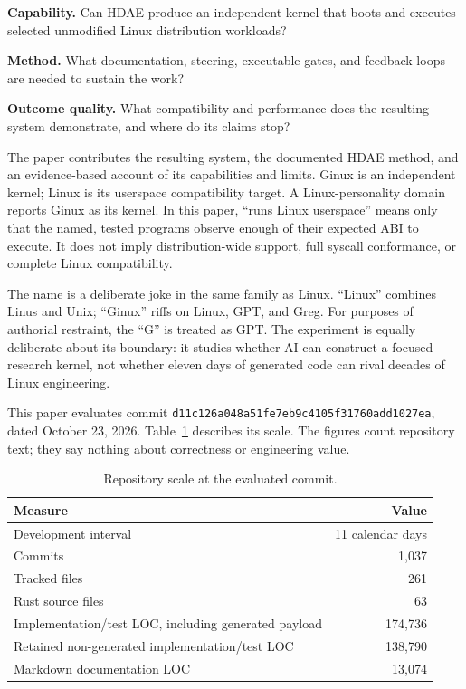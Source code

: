 \documentclass[11pt]{article}
\newcommand{\evaluatedcommit}{\texttt{d11c126a048a\allowbreak{}51fe7eb9c410\allowbreak{}5f31760add10\allowbreak{}27ea}}
\begin{document}
\begin{description}[
  style=multiline,
  leftmargin=0.82in,
  labelwidth=0.62in,
  labelsep=0.20in,
  itemsep=0.45em,
  topsep=0.45em
]
\item[\textbf{RQ1}] \textbf{Capability.} Can HDAE produce an independent kernel
  that boots and executes selected unmodified Linux distribution workloads?
\item[\textbf{RQ2}] \textbf{Method.} What documentation, steering, executable
  gates, and feedback loops are needed to sustain the work?
\item[\textbf{RQ3}] \textbf{Outcome quality.} What compatibility and performance
  does the resulting system demonstrate, and where do its claims stop?
\end{description}

The paper contributes the resulting system, the documented HDAE method,
and an evidence-based account of its capabilities and limits. Ginux is
an independent kernel; Linux is its userspace compatibility target. A
Linux-personality domain reports Ginux as its kernel. In this paper,
``runs Linux userspace'' means only that the named, tested programs observe
enough of their expected ABI to execute. It does not imply distribution-wide
support, full syscall conformance, or complete Linux compatibility.

The name is a deliberate joke in the same family as Linux. ``Linux'' combines
Linus and Unix; ``Ginux'' riffs on Linux, GPT, and Greg. For purposes of
authorial restraint, the ``G'' is treated as GPT. The experiment is equally
deliberate about its boundary: it studies whether AI can construct a focused
research kernel, not whether eleven days of generated code can rival decades of
Linux engineering.

This paper evaluates commit \evaluatedcommit{}, dated October 23, 2026.
Table~\ref{tab:scale} describes its scale. The figures count repository text;
they say nothing about correctness or engineering value.

\begin{table}[ht]
\centering
\begin{tabular}{lr}
\toprule
Measure & Value \\
\midrule
Development interval & 11 calendar days \\
Commits & 1,037 \\
Tracked files & 261 \\
Rust source files & 63 \\
Implementation/test LOC, including generated payload & 174,736 \\
Retained non-generated implementation/test LOC & 138,790 \\
Markdown documentation LOC & 13,074 \\
\bottomrule
\end{tabular}
\caption{Repository scale at the evaluated commit.}
\label{tab:scale}
\end{table}
\end{document}
